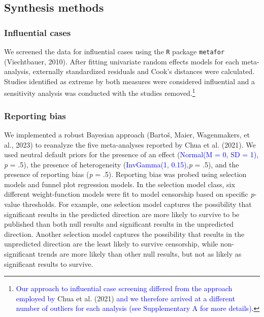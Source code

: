 \documentclass[
  man, donotrepeattitle,floatsintext]{apa7}
\begin{document}
\hypertarget{synthesis-methods}{%
\subsection{Synthesis methods}\label{synthesis-methods}}

\hypertarget{influential-cases}{%
\subsubsection{Influential cases}\label{influential-cases}}

We screened the data for influential cases using the \texttt{R} package \texttt{metafor} (Viechtbauer, 2010). After fitting univariate random effects models for each meta-analysis, externally standardized residuals and Cook's distances were calculated. Studies identified as extreme by both measures were considered influential and a sensitivity analysis was conducted with the studies removed.\footnote{\textcolor{blue}{Our approach to influential case screening differed from the approach employed by} Chua et al. (2021) \textcolor{blue}{and we therefore arrived at a different number of outliers for each analysis (see Supplementary A for more details).}}

\hypertarget{reporting-bias}{%
\subsubsection{Reporting bias}\label{reporting-bias}}

We implemented a robust Bayesian approach (Bartoš, Maier, Wagenmakers, et al., 2023) to reanalyze the five meta-analyses reported by Chua et al. (2021). We used neutral default priors for the presence of an effect (\textcolor{blue}{Normal(M = 0, SD = 1),} \emph{p} = .5), the presence of heterogeneity (\textcolor{blue}{InvGamma(1, 0.15),}\emph{p} = .5), and the presence of reporting bias (\emph{p} = .5). Reporting bias was probed using selection models and funnel plot regression models. In the selection model class, six different weight-function models were fit to model censorship based on specific \emph{p}-value thresholds. For example, one selection model captures the possibility that significant results in the predicted direction are more likely to survive to be published than both null results and significant results in the unpredicted direction. Another selection model captures the possibility that results in the unpredicted direction are the least likely to survive censorship, while non-significant trends are more likely than other null results, but not as likely as significant results to survive.
\end{document}
